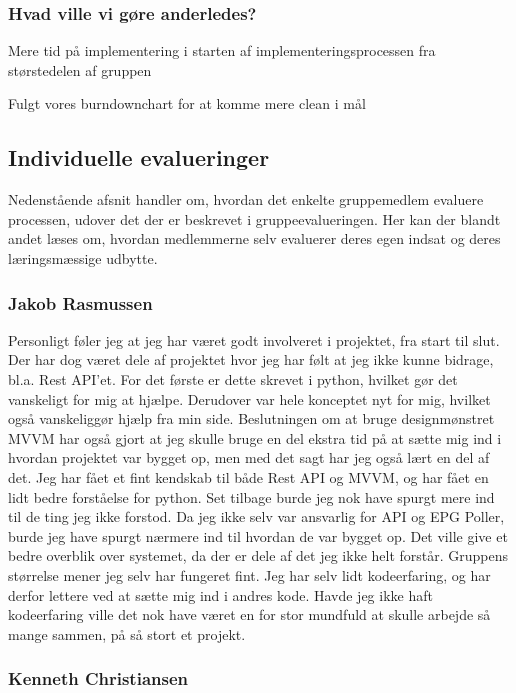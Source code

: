 \subsubsection{Hvad ville vi gøre anderledes?}

Mere tid på implementering i starten af implementeringsprocessen fra størstedelen af gruppen

Fulgt vores burndownchart for at komme mere clean i mål


\subsection{Individuelle evalueringer}
Nedenstående afsnit handler om, hvordan det enkelte gruppemedlem evaluere processen, udover det der er beskrevet i gruppeevalueringen. Her kan der blandt andet læses om, hvordan medlemmerne selv evaluerer deres egen indsat og deres læringsmæssige udbytte.  

\subsubsection{Jakob Rasmussen}
Personligt føler jeg at jeg har været godt involveret i projektet, fra start til slut. Der har dog været dele af projektet hvor jeg har følt at jeg ikke kunne bidrage, bl.a. Rest API'et. For det første er dette skrevet i python, hvilket gør det vanskeligt for mig at hjælpe. Derudover var hele konceptet nyt for mig, hvilket også vanskeliggør hjælp fra min side. Beslutningen om at bruge designmønstret MVVM har også gjort at jeg skulle bruge en del ekstra tid på at sætte mig ind i hvordan projektet var bygget op, men med det sagt har jeg også lært en del af det. Jeg har fået et fint kendskab til både Rest API og MVVM, og har fået en lidt bedre forståelse for python. Set tilbage burde jeg nok have spurgt mere ind til de ting jeg ikke forstod. Da jeg ikke selv var ansvarlig for API og EPG Poller, burde jeg have spurgt nærmere ind til hvordan de var bygget op. Det ville give et bedre overblik over systemet, da der er dele af det jeg ikke helt forstår.
Gruppens størrelse mener jeg selv har fungeret fint. Jeg har selv lidt kodeerfaring, og har derfor lettere ved at sætte mig ind i andres kode. Havde jeg ikke haft kodeerfaring ville det nok have været en for stor mundfuld at skulle arbejde så mange sammen, på så stort et projekt.


\subsubsection{Kenneth Christiansen}


